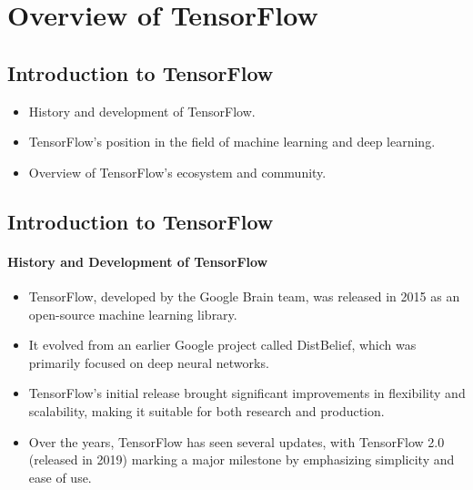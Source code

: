 \documentclass[a4paper,12pt]{book}
\begin{document}

\begin{comment}
\chapter{Introduction to TensorFlow and Keras}

\section{Overview of TensorFlow}
\begin{itemize}
    \item Introduction to TensorFlow
    \item Core concepts of TensorFlow
    \item TensorFlow's computation graph
    \item Basic TensorFlow operations
\end{itemize}
\end{comment}

\section{Overview of TensorFlow}
\subsection{Introduction to TensorFlow}
\begin{itemize}
    \item History and development of TensorFlow.
    \item TensorFlow's position in the field of machine learning and deep learning.
    \item Overview of TensorFlow's ecosystem and community.
\end{itemize}


\subsection{Introduction to TensorFlow}

\paragraph{History and Development of TensorFlow}
\begin{itemize}
    \item TensorFlow, developed by the Google Brain team, was released in 2015 as an open-source machine learning library.
    \item It evolved from an earlier Google project called DistBelief, which was primarily focused on deep neural networks.
    \item TensorFlow's initial release brought significant improvements in flexibility and scalability, making it suitable for both research and production.
    \item Over the years, TensorFlow has seen several updates, with TensorFlow 2.0 (released in 2019) marking a major milestone by emphasizing simplicity and ease of use.
\end{itemize}
\end{document}
